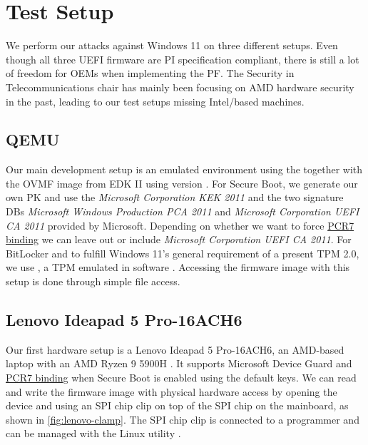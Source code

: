 
\chapter{Test Setup}
\label{sec:test-setup}

We perform our attacks against Windows 11 on three different setups.
Even though all three \ac{UEFI} firmware are \ac{PI} specification compliant, there is still a lot of freedom for \acp{OEM} when implementing the \ac{PF}.
The Security in Telecommunications chair has mainly been focusing on \ac{AMD} hardware security in the past, leading to our test setups missing Intel\-/based machines.

\section{\acs{QEMU}}
\label{sec:test-setup:qemu}

Our main development setup is an emulated environment using the  \cite{qemu} together with the \ac{OVMF} image from \ac{EDK} II using version .
For Secure Boot, we generate our own \ac{PK} and use the \emph{Microsoft Corporation \acs{KEK}  2011} and the two signature \acp{DB} \emph{Microsoft Windows Production PCA 2011} and \emph{Microsoft Corporation UEFI CA 2011} provided by Microsoft.
Depending on whether we want to force \hyperlink{pcr7-binding}{\ac{PCR}7 binding} we can leave out or include \emph{Microsoft Corporation UEFI CA 2011}.
For BitLocker and to fulfill Windows 11's general requirement of a present \ac{TPM} 2.0, we use , a \ac{TPM} emulated in software \cite{swtpm}.
Accessing the firmware image with this setup is done through simple file access.

\section{Lenovo Ideapad 5 Pro-16ACH6}
\label{sec:test-setup:lenovo}

Our first hardware setup is a Lenovo Ideapad 5 Pro-16ACH6, an \ac{AMD}-based laptop with an \ac{AMD} Ryzen 9 5900H \cite{lenovo-ideapad}.
It supports Microsoft Device Guard and \hyperlink{pcr7-binding}{\ac{PCR}7 binding} when Secure Boot is enabled using the default keys.
We can read and write the firmware image with physical hardware access by opening the device and using an \ac{SPI} chip clip on top of the \ac{SPI} chip on the mainboard, as shown in \autoref{fig:lenovo-clamp}.
The \ac{SPI} chip clip is connected to a programmer and can be managed with the Linux utility .

